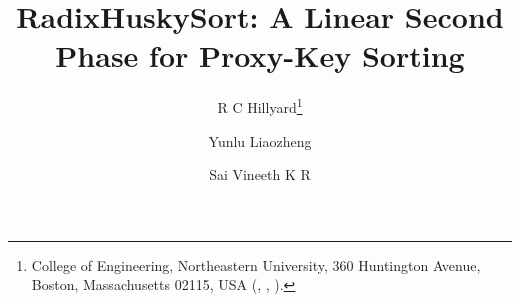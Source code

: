 \documentclass[twoside,leqno,twocolumn]{article}
\date{ }
\newif\ifanonymous
\begin{document}
\title{RadixHuskySort: A Linear Second Phase for Proxy-Key Sorting}

\ifanonymous
  \author{Anonymous Author(s)}
\else
  \author{R C Hillyard\thanks{College of Engineering, Northeastern University, 360 Huntington
      Avenue, Boston, Massachusetts 02115, USA (,
      , ).}
    \and Yunlu Liaozheng\footnotemark[1]
    \and Sai Vineeth K R\footnotemark[1]}
\fi




\end{document}
